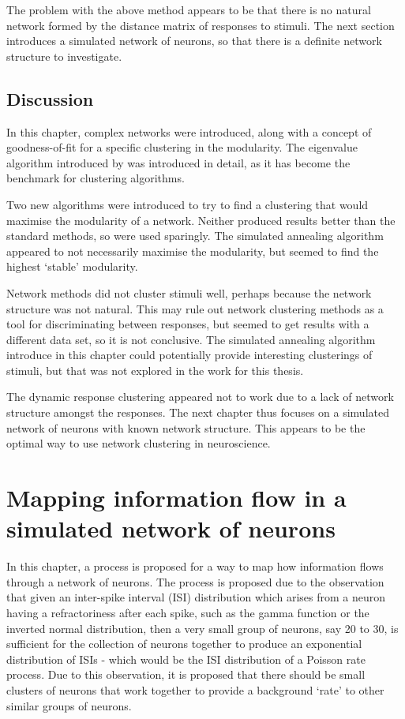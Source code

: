 The problem with the above method appears to be that there is no natural network formed by the distance matrix of responses to stimuli. The next section introduces a simulated network of neurons, so that there is a definite network structure to investigate.

\section{Discussion}
In this chapter, complex networks were introduced, along with a concept of goodness-of-fit for a specific clustering in the modularity.  The eigenvalue algorithm introduced by \citet{Newman2006b} was introduced in detail, as it has become the benchmark for clustering algorithms.

Two new algorithms were introduced to try to find a clustering that would maximise the modularity of a network. Neither produced results better than the standard methods, so were used sparingly. The simulated annealing algorithm appeared to not necessarily maximise the modularity, but seemed to find the highest \lq{}stable\rq{} modularity. 

Network methods did not cluster stimuli well, perhaps because the network structure was not natural. This may rule out network clustering methods as a tool for discriminating between responses, but \citep{Humphries2011a} seemed to get results with a different data set, so it is not conclusive.  The simulated annealing algorithm introduce in this chapter could potentially provide interesting clusterings of stimuli, but that was not explored in the work for this thesis.

The dynamic response clustering appeared not to work due to a lack of network structure amongst the responses.  The next chapter thus focuses on a simulated network of neurons with known network structure.  This appears to be the optimal way to use network clustering in neuroscience.
\cleardoublepage

%
%

\chapter{Mapping information flow in a simulated network of neurons}

In this chapter, a process is proposed for a way to map how information flows through a network of neurons.  The process is proposed due to the observation that given an inter-spike interval (ISI) distribution which arises from a neuron having a refractoriness after each spike, such as the gamma function or the inverted normal distribution, then a very small group of neurons, say 20 to 30, is sufficient for the collection of neurons together to produce an exponential distribution of ISIs - which would be the ISI distribution of a Poisson rate process.  Due to this observation, it is proposed that there should be small clusters of neurons that work together to provide a background \lq{}rate\rq{} to other similar groups of neurons.

